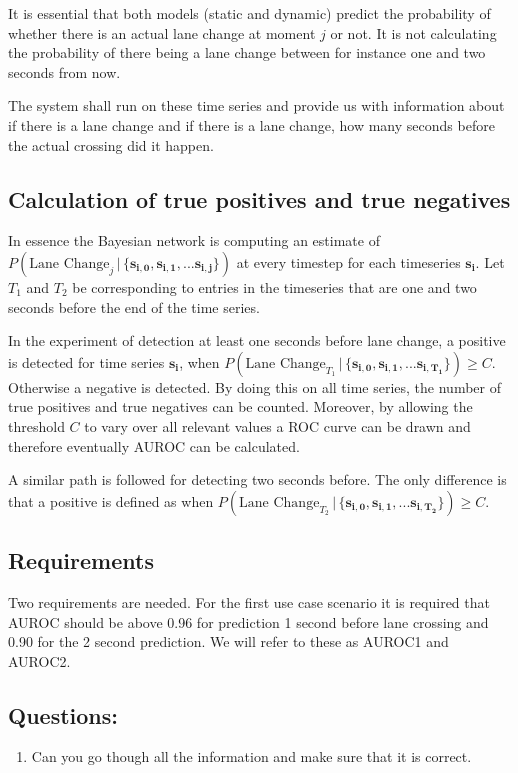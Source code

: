 \documentclass{article}
\theoremstyle{theorem}
\theoremstyle{definition}
\newcommand{\bu}[1]{\mathbf{#1}}
\newcommand{\bv}[1]{\bm{#1}}
\begin{document}
It is essential that both models (static and dynamic) predict the probability of whether there is an actual lane change at moment $j$ or not. It is not calculating the probability of there being a lane change between for instance one and two seconds from now.  




The system shall run on these time series and provide us with information about if there is a lane change and if there is a lane change, how many seconds before the actual crossing did it happen.

\subsection*{Calculation of true positives and true negatives}

 In essence the Bayesian network is computing an estimate of $P(\mbox{Lane Change}_j \,|\, \{ \bv{s_{i,0}}, \bv{s_{i,1}}, ... \bv{s_{i,j}} \})$ at every timestep for each timeseries $\bu{s_i}$.  Let $T_1$ and $T_2$ be corresponding to entries in the timeseries that are one and two seconds before the end of the time series.   

In the experiment of detection at least one seconds before lane change, a positive is detected for time series $\bu{s_i}$, when  $P(\mbox{Lane Change}_{T_1} \,|\, \{ \bv{s_{i,0}}, \bv{s_{i,1}}, ... \bv{s_{i,T_1}} \}) \geq C$.  Otherwise a negative is detected.  By doing this on all time series, the number of true positives and true negatives can be counted. Moreover, by allowing the threshold $C$ to vary over all relevant values a ROC curve can be drawn and therefore eventually AUROC can be calculated.

A similar path is followed for detecting two seconds before.  The only difference is that a positive is defined as when  $P(\mbox{Lane Change}_{T_2} \,|\, \{ \bv{s_{i,0}}, \bv{s_{i,1}}, ... \bv{s_{i,T_2}} \}) \geq C$.

\subsection*{Requirements}
Two requirements are needed.  For the first use case scenario it is required that AUROC should be above 0.96 for prediction 1 second before lane crossing and 0.90 for the 2 second prediction.  We will refer to these as AUROC1 and AUROC2.  

\subsection*{Questions: }
\begin{enumerate}
\item Can you go though all the information and make sure that it is correct.
\end{enumerate}
\end{document}
